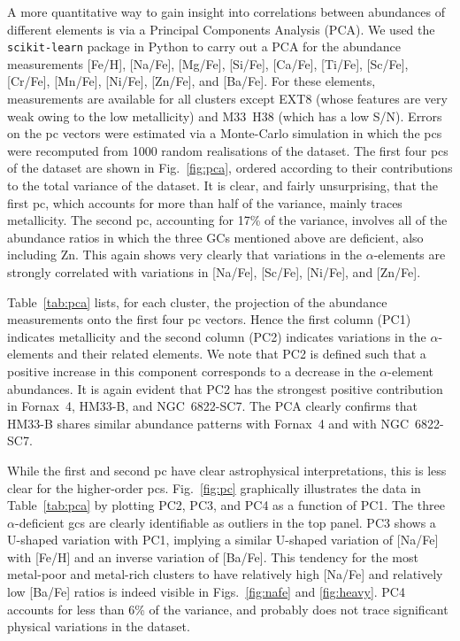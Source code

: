 \documentclass{aa}
\begin{document}
A more quantitative way to gain insight into correlations between abundances of different elements is via a Principal Components Analysis (PCA). We used the \texttt{scikit-learn} package \citep{Pedregosa2011} in Python to carry out a PCA for the abundance measurements [Fe/H], [Na/Fe], [Mg/Fe], [Si/Fe], [Ca/Fe], [Ti/Fe],  [Sc/Fe], [Cr/Fe], [Mn/Fe], [Ni/Fe], [Zn/Fe], and [Ba/Fe]. For these elements, measurements are available for all clusters except EXT8 (whose  features are very weak owing to the low metallicity) and M33~H38 (which has a low S/N). Errors on the \ac{pc} vectors were estimated via a Monte-Carlo simulation in which the \acp{pc} were recomputed from 1000 random realisations of the dataset. 
The first four \acp{pc} of the dataset are shown in Fig.~\ref{fig:pca}, ordered according to their contributions to the total variance of the dataset. It is clear, and fairly unsurprising, that the first \ac{pc}, which accounts for more than half of the variance, mainly traces metallicity. The second \ac{pc}, accounting for 17\% of the variance, involves all of the abundance ratios in which the three GCs mentioned above are deficient, also including Zn. This again shows very clearly that variations in the $\alpha$-elements are strongly correlated with variations in [Na/Fe], [Sc/Fe], [Ni/Fe], and [Zn/Fe]. 

Table~\ref{tab:pca} lists, for each cluster, the projection of the abundance measurements onto the first four  \ac{pc} vectors. Hence the first column (PC1) indicates metallicity and the second column (PC2) indicates variations in the $\alpha$-elements and their related elements. We note that PC2 is defined such that a positive increase in this component corresponds to a decrease in the $\alpha$-element abundances. It is again evident that PC2 has the strongest positive contribution in Fornax~4, HM33-B, and NGC~6822-SC7. The PCA clearly confirms that HM33-B shares similar abundance patterns with Fornax~4 and with NGC~6822-SC7.

While the first and second \ac{pc} have clear astrophysical interpretations, this is less clear for the higher-order \acp{pc}. Fig.~\ref{fig:pc} graphically illustrates the data in Table~\ref{tab:pca} by plotting PC2, PC3, and PC4 as a function of PC1. The three $\alpha$-deficient \acp{gc} are clearly identifiable as outliers in the top panel. PC3 shows a U-shaped variation with PC1, implying a similar U-shaped variation of [Na/Fe] with [Fe/H] and an inverse variation of [Ba/Fe]. This tendency for the most metal-poor and metal-rich clusters to have relatively high [Na/Fe] and relatively low [Ba/Fe] ratios is indeed visible in Figs.~\ref{fig:nafe} and \ref{fig:heavy}. PC4 accounts for less than 6\% of the variance, and probably does not trace significant physical variations in the dataset.
\end{document}
